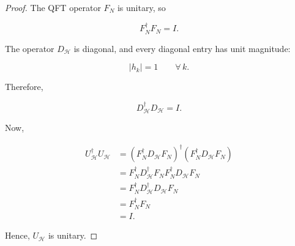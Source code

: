\documentclass[10pt,a4paper]{amsart}
\begin{document}
\begin{proof}
The QFT operator $F_N$ is unitary, so

\begin{equation}
F_N^\dagger F_N=I.
\end{equation}

The operator $D_{\mathcal H}$ is diagonal, and every diagonal entry has unit magnitude:

\begin{equation}
|h_k|=1 \qquad \forall\, k. 
\end{equation}

Therefore,

\begin{equation}
D_{\mathcal H}^\dagger D_{\mathcal H}
=
I.
\end{equation}

Now,

\begin{align}
U_{\mathcal H}^\dagger U_{\mathcal H}
&=
\left(
F_N^\dagger D_{\mathcal H}F_N
\right)^\dagger
\left(
F_N^\dagger D_{\mathcal H}F_N
\right)\\
&=
F_N^\dagger
D_{\mathcal H}^\dagger
F_NF_N^\dagger
D_{\mathcal H}
F_N\\
&=
F_N^\dagger
D_{\mathcal H}^\dagger
D_{\mathcal H}
F_N\\
&=
F_N^\dagger F_N\\
&=
I.
\end{align}

Hence, $U_{\mathcal H}$ is unitary.
\end{proof}
\end{document}
